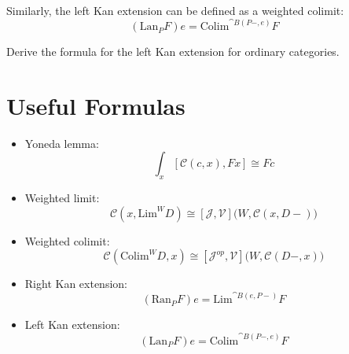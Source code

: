 \documentclass[DaoFP]{subfiles}
\begin{document}
Similarly, the left Kan extension can be defined as a weighted colimit:
\[ (\text{Lan}_P F) e = \text{Colim}^{\cat B(P-, e)} F \]

\begin{exercise}
Derive the formula for the left Kan extension for ordinary categories.
\end{exercise}

\section{Useful Formulas}
\begin{itemize}
\item Yoneda lemma:
\[ \int_x [\mathcal C( c, x), F x] \cong F c \]
\item Weighted limit:
\[  \mathcal C(x, \text{Lim}^W D) \cong [\mathcal J, \mathcal V] \big(W, \mathcal C(x, D-)\big) \]
\item Weighted colimit:
\[  \mathcal C(\text{Colim}^W D, x) \cong [\mathcal J^{op}, \mathcal V] \big(W, \mathcal C(D-, x)\big) \]
\item Right Kan extension:
\[ (\text{Ran}_P F) e = \text{Lim}^{\cat B(e, P-)} F  \]
\item Left Kan extension:
\[ (\text{Lan}_P F) e = \text{Colim}^{\cat B(P-, e)} F \]
\end{itemize}
\end{document}
